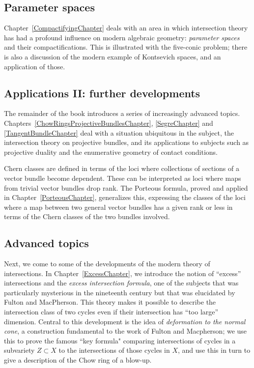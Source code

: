 \subsection{Parameter spaces}

Chapter~\ref{CompactifyingChapter}
deals with an area in which intersection theory has had a profound influence on modern algebraic geometry: \emph{parameter spaces} and their compactifications. This is illustrated with the five-conic problem; there is also a discussion of the modern example of Kontsevich spaces, and an application of those. 

\subsection{Applications II: further developments}

The remainder of the book introduces a series of increasingly advanced topics. Chapters~\ref{ChowRingsProjectiveBundlesChapter}, \ref{SegreChapter}
 and \ref{TangentBundleChapter}
deal with a situation ubiquitous in the subject, the intersection theory on projective bundles, and its applications to subjects such as projective duality and the enumerative geometry of contact conditions. 

Chern classes are defined in terms of the loci where  collections of sections of a vector bundle become dependent. These can be interpreted as loci where maps from  trivial vector bundles drop rank. The Porteous formula, proved and applied in Chapter~\ref{PorteousChapter}, generalizes this, 
expressing the classes of the loci where a map between two general vector bundles has a given rank or less in terms of the Chern classes of the two bundles involved.

\subsection{Advanced topics}

Next, we come to some of the developments of the modern theory of intersections. In Chapter~\ref{ExcessChapter}, we introduce the notion of ``excess'' intersections and the \emph{excess intersection formula}, one of the subjects that was particularly mysterious in the nineteenth century but that was elucidated by Fulton and MacPherson. This theory makes it possible to describe the intersection class of two cycles even if their intersection has ``too large'' dimension.  Central to this development is the idea of \emph{deformation to the normal cone}, a construction fundamental to the work of Fulton and Macpherson; we use this to prove the famous ``key formula" comparing intersections of cycles in a subvariety $Z \subset X$ to the intersections of those cycles in $X$, and use this in turn to give a description of the Chow ring of a blow-up.

